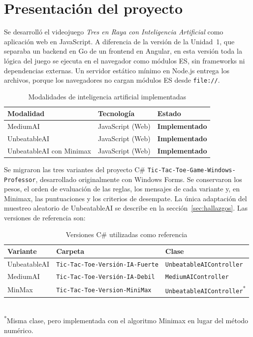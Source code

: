 \documentclass[12pt,a4paper]{article}
\begin{document}
\section{Presentación del proyecto}
Se desarrolló el videojuego \emph{Tres en Raya con Inteligencia Artificial} como
aplicación web en JavaScript. A diferencia de la versión de la Unidad~1, que
separaba un backend en Go de un frontend en Angular, en esta versión toda la
lógica del juego se ejecuta en el navegador como módulos ES, sin frameworks ni
dependencias externas. Un servidor estático mínimo en Node.js entrega los
archivos, porque los navegadores no cargan módulos ES desde \texttt{file://}.

\begin{table}[H]
\centering
\caption{Modalidades de inteligencia artificial implementadas}
\begin{tabular}{lll}
\toprule
\textbf{Modalidad} & \textbf{Tecnología} & \textbf{Estado}\\
\midrule
MediumAI & JavaScript (Web) & \textbf{Implementado}\\
UnbeatableAI & JavaScript (Web) & \textbf{Implementado}\\
UnbeatableAI con Minimax & JavaScript (Web) & \textbf{Implementado}\\
\bottomrule
\end{tabular}
\end{table}

Se migraron las tres variantes del proyecto C\#
\texttt{Tic-Tac-Toe-Game-Windows-Professor}, desarrollado originalmente con
Windows Forms. Se conservaron los pesos, el orden de evaluación de las reglas,
los mensajes de cada variante y, en Minimax, las puntuaciones y los criterios de
desempate. La única adaptación del muestreo aleatorio de UnbeatableAI se
describe en la sección~\ref{sec:hallazgos}. Las versiones de referencia son:

\begin{table}[H]
\centering
\caption{Versiones C\# utilizadas como referencia}
\small
\begin{tabular}{p{2.3cm}p{6.6cm}p{5cm}}
\toprule
\textbf{Variante} & \textbf{Carpeta} & \textbf{Clase}\\
\midrule
UnbeatableAI & \texttt{Tic-Tac-Toe-Versión-IA-Fuerte} & \texttt{UnbeatableAIController}\\
MediumAI & \texttt{Tic-Tac-Toe-Versión-IA-Debil} & \texttt{MediumAIController}\\
MinMax & \texttt{Tic-Tac-Toe-Version-MiniMax} & \texttt{UnbeatableAIController}\textsuperscript{*}\\
\bottomrule
\end{tabular}\\[2pt]
{\footnotesize \textsuperscript{*}Misma clase, pero implementada con el algoritmo Minimax en lugar del método numérico.}
\end{table}
\end{document}
